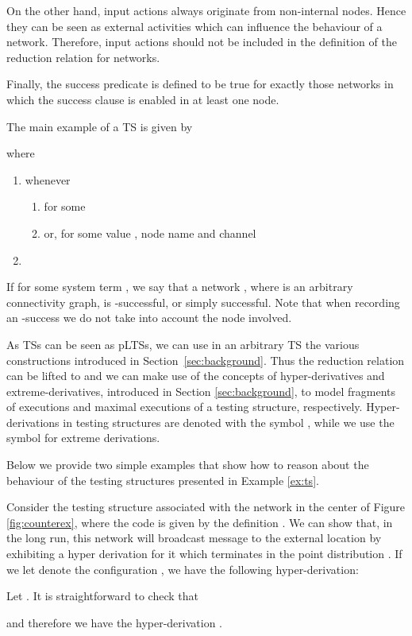 \documentclass{LMCS}
\begin{document}
On the other hand, input actions always originate from non-internal 
nodes. Hence they can be seen as external activities which can influence 
 the behaviour of a 
network. Therefore, input actions should not be included in the definition 
of the reduction relation for networks. 

Finally, the success predicate  is defined to be true for exactly 
those networks in which the success clause  is enabled in 
at least one node.


\begin{exa}\label{ex:ts}
The main example of a TS is given by

where 
\begin{enumerate}[label=(\roman*)]
\item  whenever
  \begin{enumerate}[label=(\alph*)]
  \item  for some 

  \item or,  for some value , node name  and channel 
\end{enumerate}
  
\item ~

\end{enumerate}
If  for some system term , we say that a network , where 
 is an arbitrary connectivity graph, is -successful, or simply successful. 
Note that when recording an -success we do not take into account the node involved.
  \end{exa}
\noindent
As TSs can be seen as pLTSs, we can use in an arbitrary TS the various constructions
introduced in Section~\ref{sec:background}. Thus the reduction relation 
  can be lifted to 
 and 
we can make use of the concepts of 
hyper-derivatives and extreme-derivatives, introduced in Section \ref{sec:background}, to 
model fragments of executions and maximal executions of a testing structure, respectively.
Hyper-derivations in testing structures are denoted with the symbol , while 
we use the symbol  for extreme derivations.

Below we provide two simple examples that show how to reason about the behaviour of the testing 
structures presented in Example \ref{ex:ts}.


\begin{exa}
\label{ex:hypder}
Consider the testing structure associated with the network  in
the center of Figure \ref{fig:counterex}, where the code  is given
by the definition . We can
show that, in the long run, this network will broadcast message  to
the external location  by exhibiting a hyper derivation for it
which terminates in the point distribution .  If we let  denote the configuration ,  we have the following 
hyper-derivation:

\noindent
Let . 
It is straightforward to check  that

and therefore we have the hyper-derivation . 
\end{exa}
\end{document}
